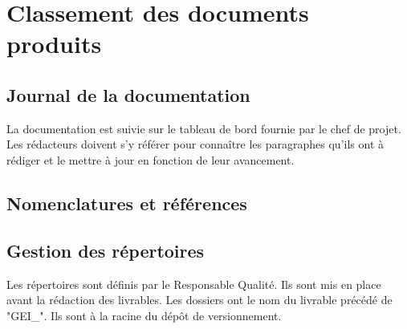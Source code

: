 \section{Classement des documents produits}

\subsection{Journal de la documentation}
La documentation est suivie sur le tableau de bord fournie par le chef de 
projet. Les rédacteurs doivent s'y référer pour connaître les paragraphes
qu'ils ont à rédiger et le mettre à jour en fonction de leur avancement.

\subsection{Nomenclatures et références}


\subsection{Gestion des répertoires}
Les répertoires sont définis par le Responsable Qualité. Ils sont mis en place
avant la rédaction des livrables. Les dossiers ont le nom du livrable précédé
de "GEI_". Ils sont à la racine du dépôt de versionnement.
